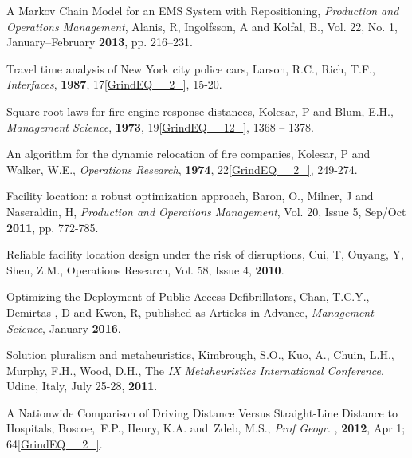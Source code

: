 \documentclass{article} %
\begin{document}
\noindent 

\noindent [5] A Markov Chain Model for an EMS System with Repositioning, \textit{Production and Operations Management}, Alanis, R, Ingolfsson, A and Kolfal, B., Vol. 22, No. 1, January--February \textbf{2013}, pp. 216--231.

\noindent 

\noindent [6] Travel time analysis of New York city police cars, Larson, R.C., Rich, T.F.,  \textit{Interfaces}, \textbf{1987}, 17\eqref{GrindEQ__2_}, 15-20.

\noindent 

\noindent [7] Square root laws for fire engine response distances, Kolesar, P and Blum, E.H., \textit{Management Science}, \textbf{1973}, 19\eqref{GrindEQ__12_}, 1368 -- 1378.

\noindent 

\noindent [8] An algorithm for the dynamic relocation of fire companies, Kolesar, P and Walker, W.E., \textit{Operations Research}, \textbf{1974}, 22\eqref{GrindEQ__2_}, 249-274.

\noindent 

\noindent [9] Facility location: a robust optimization approach, Baron, O., Milner, J and Naseraldin, H, \textit{Production and Operations Management}, Vol. 20, Issue 5, Sep/Oct \textbf{2011}, pp. 772-785.

\noindent 

\noindent [10] Reliable facility location design under the risk of disruptions, Cui, T, Ouyang, Y, Shen, Z.M., Operations Research, Vol. 58, Issue 4, \textbf{2010}.

\noindent 

\noindent [11] Optimizing the Deployment of Public Access Defibrillators, Chan, T.C.Y., Demirtas , D and Kwon, R, published as Articles in Advance, \textit{Management Science}, January \textbf{2016}.

\noindent  

\noindent [12] Solution pluralism and metaheuristics, Kimbrough, S.O., Kuo, A., Chuin, L.H., Murphy, F.H., Wood, D.H., The \textit{IX Metaheuristics International Conference}, Udine, Italy, July 25-28, \textbf{2011}.

\noindent 

\noindent [13] A Nationwide Comparison of Driving Distance Versus Straight-Line Distance to Hospitals, Boscoe,~F.P., Henry, K.A. and~Zdeb, M.S., \textit{Prof Geogr.} , \textbf{2012},  Apr 1; 64\eqref{GrindEQ__2_}.
\end{document}
